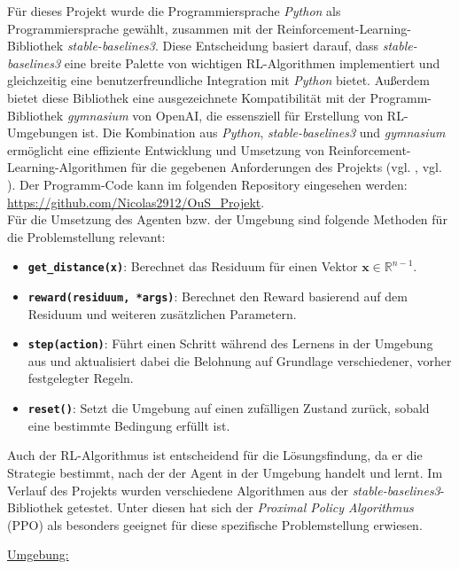 \documentclass{article}
\def\code#1{\texttt{#1}}
\theoremstyle{newline}
\begin{document}
\begin{onehalfspace}
Für dieses Projekt wurde die Programmiersprache \textit{Python} als Programmiersprache gewählt, zusammen mit der Reinforcement-Learning-Bibliothek \textit{stable-baselines3}. Diese Entscheidung basiert darauf, dass \textit{stable-baselines3} eine breite Palette von wichtigen RL-Algorithmen implementiert und gleichzeitig eine benutzerfreundliche Integration mit \textit{Python} bietet. Außerdem bietet diese Bibliothek eine ausgezeichnete Kompatibilität mit der Programm-Bibliothek \textit{gymnasium} von OpenAI, die essensziell für Erstellung von RL-Umgebungen ist. Die Kombination aus \textit{Python}, \textit{stable-baselines3} und \textit{gymnasium} ermöglicht eine effiziente Entwicklung und Umsetzung von Reinforcement-Learning-Algorithmen für die gegebenen Anforderungen des Projekts (vgl. \cite{Raffin2021}, vgl. \cite{Towers2023}). Der Programm-Code kann im folgenden Repository eingesehen werden: \url{https://github.com/Nicolas2912/OuS_Projekt}.
\\

Für die Umsetzung des Agenten bzw. der Umgebung sind folgende Methoden für die Problemstellung relevant:

\begin{itemize}
	\item \textbf{\code{get\_distance(x)}}: Berechnet das Residuum für einen Vektor $\mathbf{x} \in \mathbb{R}^{n-1}$.
	\item \textbf{\code{reward(residuum, *args)}}: Berechnet den Reward basierend auf dem Residuum und weiteren zusätzlichen Parametern.
	\item \textbf{\code{step(action)}}: Führt einen Schritt während des Lernens in der Umgebung aus und aktualisiert dabei die Belohnung auf Grundlage verschiedener, vorher festgelegter Regeln.
	\item \textbf{\code{reset()}}: Setzt die Umgebung auf einen zufälligen Zustand zurück, sobald eine bestimmte Bedingung erfüllt ist.
\end{itemize}
\bigskip

Auch der RL-Algorithmus ist entscheidend für die Lösungsfindung, da er die Strategie bestimmt, nach der der Agent in der Umgebung handelt und lernt. Im Verlauf des Projekts wurden verschiedene Algorithmen aus der \textit{stable-baselines3}-Bibliothek getestet. Unter diesen hat sich der \textit{Proximal Policy Algorithmus} (PPO) als besonders geeignet für diese spezifische Problemstellung erwiesen.
\medskip

\underline{Umgebung:}
\smallskip


\end{onehalfspace}
\end{document}
